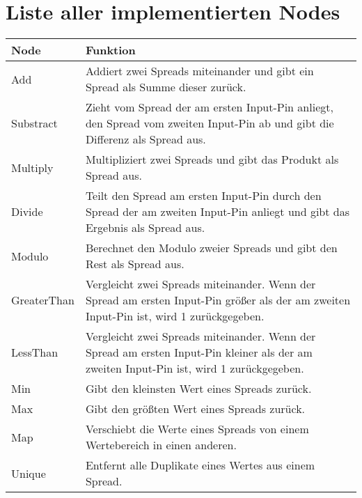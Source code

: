 \documentclass[a4paper, 
               12pt,
               DIV=calc,
               version=first,
               pdftex,
               headsepline,
               footsepline,
               bibtotocnumbered,
               liststotocnumbered]{scrreprt}
\begin{document}
\section{Liste aller implementierten Nodes}
\label{sec:alleNodes}
\centering
\begin{tabular}{|l|p{10cm}|}
\hline
\textbf{Node} & \textbf{Funktion}\\
\hline
Add & Addiert zwei Spreads miteinander und gibt ein Spread als Summe dieser zurück.\\
\hline
Substract & Zieht vom Spread der am ersten Input-Pin anliegt, den Spread vom zweiten Input-Pin ab und gibt die Differenz als Spread aus.\\
\hline
Multiply & Multipliziert zwei Spreads und gibt das Produkt als Spread aus.\\
\hline
Divide & Teilt den Spread am ersten Input-Pin durch den Spread der am zweiten Input-Pin anliegt und gibt das Ergebnis als Spread aus.\\
\hline
Modulo & Berechnet den Modulo zweier Spreads und gibt den Rest als Spread aus.\\
\hline
GreaterThan & Vergleicht zwei Spreads miteinander. Wenn der Spread am ersten Input-Pin größer
als der am zweiten Input-Pin ist, wird 1 zurückgegeben.\\
\hline
LessThan & Vergleicht zwei Spreads miteinander. Wenn der Spread am ersten Input-Pin kleiner
als der am zweiten Input-Pin ist, wird 1 zurückgegeben.\\
\hline
Min & Gibt den kleinsten Wert eines Spreads zurück.\\
\hline
Max & Gibt den größten Wert eines Spreads zurück.\\
\hline
Map & Verschiebt die Werte eines Spreads von einem Wertebereich in einen anderen.\\
\hline
Unique & Entfernt alle Duplikate eines Wertes aus einem Spread.\\
\hline
\end{tabular}
\end{document}
